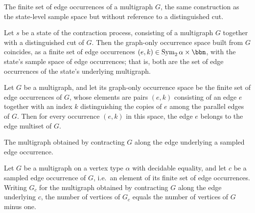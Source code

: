 \begin{definition}
\label{KargerTrace.graphChoiceSpace}
\leanok
{}
The finite set of edge occurrences of a multigraph $G$, the same construction as the
state-level sample space but without reference to a distinguished cut.
\end{definition}

\begin{lemma}
\label{KargerTrace.graphChoiceSpace_eq_edgeChoiceSpace}
\leanok
{}
Let $s$ be a state of the contraction process, consisting of a multigraph $G$ together
with a distinguished cut of $G$. Then the graph-only occurrence space built from $G$
coincides, as a finite set of edge occurrences $(e, k) \in \mathrm{Sym}_2\,\alpha \times
\bbn$, with the state's sample space of edge occurrences; that is, both are the set of
edge occurrences of the state's underlying multigraph.
\end{lemma}

\begin{lemma}
\label{KargerTrace.graphChoice_mem_edges}
\leanok
{}
Let $G$ be a multigraph, and let its graph-only occurrence space be the finite set of
edge occurrences of $G$, whose elements are pairs $(e, k)$ consisting of an edge $e$
together with an index $k$ distinguishing the copies of $e$ among the parallel edges of
$G$. Then for every occurrence $(e, k)$ in this space, the edge $e$ belongs to the edge
multiset of $G$.
\end{lemma}

\begin{definition}
\label{KargerTrace.graphAfterChoice}
\leanok
{}
The multigraph obtained by contracting $G$ along the edge underlying a sampled edge
occurrence.
\end{definition}

\begin{lemma}
\label{KargerTrace.graphAfterChoice_vertexCount_eq}
\leanok
{}
Let $G$ be a multigraph on a vertex type $\alpha$ with decidable equality, and let $c$
be a sampled edge occurrence of $G$, i.e.\ an element of its finite set of edge
occurrences. Writing $G_c$ for the multigraph obtained by contracting $G$ along the edge
underlying $c$, the number of vertices of $G_c$ equals the number of vertices of $G$
minus one.
\end{lemma}

